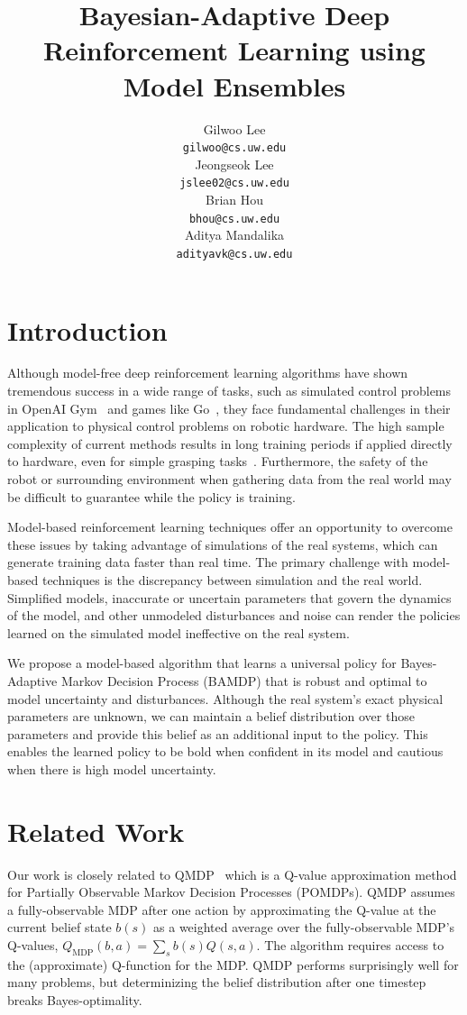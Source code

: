 \documentclass{article}
\title{Bayesian-Adaptive Deep Reinforcement Learning using Model Ensembles}
\author{
  Gilwoo Lee \\ \texttt{gilwoo@cs.uw.edu} \\
  \And
  Jeongseok Lee \\ \texttt{jslee02@cs.uw.edu} \\
  \And
  Brian Hou \\ \texttt{bhou@cs.uw.edu} \\
  \And
  Aditya Mandalika \\ \texttt{adityavk@cs.uw.edu} \\
}
\begin{document}
\maketitle


\section{Introduction}
Although model-free deep reinforcement learning algorithms have shown tremendous success in a wide range of tasks, such as simulated control problems in OpenAI Gym~\cite{openai-gym} and games like Go~\cite{alphago}, they face fundamental challenges in their application to physical control problems on robotic hardware.
The high sample complexity of current methods results in long training periods if applied directly to hardware, even for simple grasping tasks~\cite{levine2016armfarm}.
Furthermore, the safety of the robot or surrounding environment when gathering data from the real world may be difficult to guarantee while the policy is training.

Model-based reinforcement learning techniques offer an opportunity to overcome these issues by taking advantage of simulations of the real systems, which can generate training data faster than real time.
The primary challenge with model-based techniques is the discrepancy between simulation and the real world.
Simplified models, inaccurate or uncertain parameters that govern the dynamics of the model, and other unmodeled disturbances and noise can render the policies learned on the simulated model ineffective on the real system.

We propose a model-based algorithm that learns a universal policy for Bayes-Adaptive Markov Decision Process (BAMDP) that is robust and optimal to model uncertainty and disturbances. Although the real system's exact physical parameters are unknown, we can maintain a belief distribution over those parameters and provide this belief as an additional input to the policy.
This enables the learned policy to be bold when confident in its model and cautious when there is high model uncertainty.

\section{Related Work}
Our work is closely related to QMDP~\cite{littman1995learning, karkus2017qmdp} which is a Q-value approximation method for Partially Observable Markov Decision Processes (POMDPs).
QMDP assumes a fully-observable MDP after one action by approximating the Q-value at the current belief state $b(s)$ as a weighted average over the fully-observable MDP's Q-values, $Q_{\text{MDP}}(b, a) = \sum_s b(s)Q(s, a)$.
The algorithm requires access to the (approximate) Q-function for the MDP.
QMDP performs surprisingly well for many problems, but determinizing the belief distribution after one timestep breaks Bayes-optimality.
\end{document}
